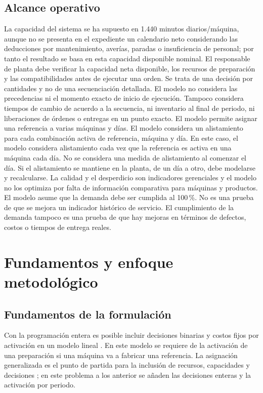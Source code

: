 \documentclass[12pt,a4paper,oneside]{article}
\begin{document}
\subsection{Alcance operativo}
La capacidad del sistema se ha supuesto en 1.440 minutos diarios/máquina, aunque no se presenta en el expediente un calendario neto considerando las deducciones por mantenimiento, averías, paradas o insuficiencia de personal; por tanto el resultado se basa en esta capacidad disponible nominal. El responsable de planta debe verificar la capacidad neta disponible, los recursos de preparación y las compatibilidades antes de ejecutar una orden. Se trata de una decisión por cantidades y no de una secuenciación detallada. El modelo no considera las precedencias ni el momento exacto de inicio de ejecución. Tampoco considera tiempos de cambio de acuerdo a la secuencia, ni inventario al final de periodo, ni liberaciones de órdenes o entregas en un punto exacto. El modelo permite asignar una referencia a varias máquinas y días. El modelo considera un alistamiento para cada combinación activa de referencia, máquina y día. En este caso, el modelo considera alistamiento cada vez que la referencia es activa en una máquina cada día. No se considera una medida de alistamiento al comenzar el día. Si el alistamiento se mantiene en la planta, de un día a otro, debe modelarse y recalcularse.
La calidad y el desperdicio son indicadores gerenciales y el modelo no los optimiza por falta de información comparativa para máquinas y productos. El modelo asume que la demanda debe ser cumplida al 100\,\%. No es una prueba de que se mejora un indicador histórico de servicio. El cumplimiento de la demanda tampoco es una prueba de que hay mejoras en términos de defectos, costos o tiempos de entrega reales.

\section{Fundamentos y enfoque metodológico}

\subsection{Fundamentos de la formulación}
Con la programación entera es posible incluir decisiones binarias y costos fijos por activación en un modelo lineal \cite{taha}. En este modelo se requiere de la activación de una preparación si una máquina va a fabricar una referencia. La asignación generalizada es el punto de partida para la inclusión de recursos, capacidades y decisiones \cite{cattrysse}; en este problema a los anterior se añaden las decisiones enteras y la activación por periodo.
\end{document}
